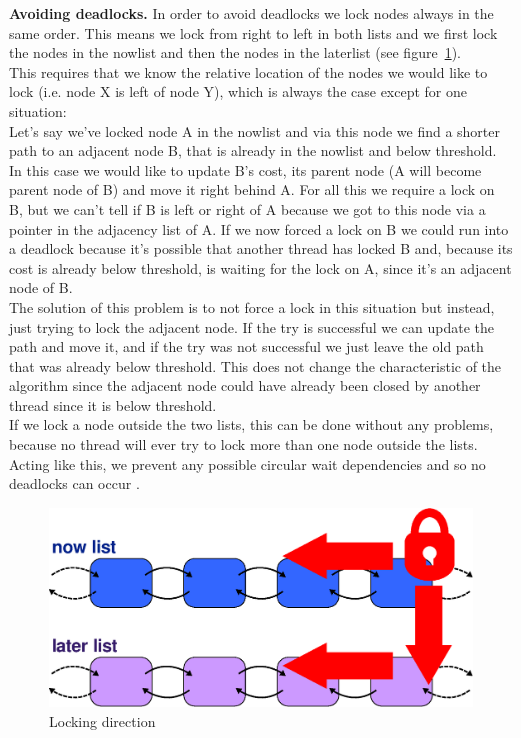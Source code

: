 \documentclass[letterpaper]{article}
\newcommand{\mypar}[1]{{\bf #1.}}
\begin{document}
\mypar{Avoiding deadlocks}
In order to avoid deadlocks we lock nodes always in the same order. This means we lock from right to left in both lists and we first lock the nodes in the nowlist and then the nodes in the laterlist (see figure~\ref{fig:lock}).\\
This requires that we know the relative location of the nodes we would like to lock (i.e. node X is left of node Y), which is always the case except for one situation:\\
Let's say we've locked node A in the nowlist and via this node we find a shorter path to an adjacent node B, that is already in the nowlist and below threshold. In this case we would like to update B's cost, its parent node (A will become parent node of B) and move it right behind A. For all this we require a lock on B, but we can't tell if B is left or right of A because we got to this node via a pointer in the adjacency list of A. If we now forced a lock on B we could run into a deadlock because it's possible that another thread has locked B and, because its cost is already below threshold, is waiting for the lock on A, since it's an adjacent node of B.\\
The solution of this problem is to not force a lock in this situation but instead, just trying to lock the adjacent node. If the try is successful we can update the path and move it, and if the try was not successful we just leave the old path that was already below threshold. This does not change the characteristic of the algorithm since the adjacent node could have already been closed by another thread since it is below threshold. \\
If we lock a node outside the two lists, this can be done without any problems, because no thread will ever try to lock more than one node outside the lists.\\
Acting like this, we prevent any possible circular wait dependencies and so no deadlocks can occur \cite{Coffman:71}.

\begin{figure}[h]\centering
  \includegraphics[scale=0.38]{locking.eps}
  \caption{Locking direction \label{fig:lock}}
\end{figure}
\end{document}

